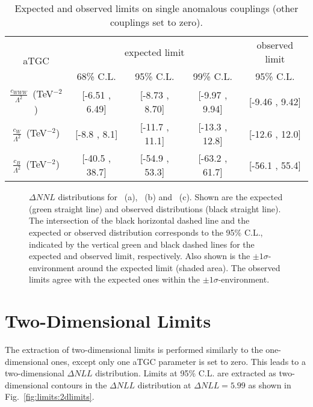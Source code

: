 \begin{table}
	\centering
	\caption[Expected and observed limits on single anomalous couplings]{Expected and observed limits on single anomalous couplings (other couplings set to zero).}
	\label{tab:limits:1dlimits}
	\begin{tabular}{ccccc}
	\hline
	\multirow{2}{*}{aTGC}              &     \multicolumn{3}{c}{expected limit} & observed limit\\
	& 68\% C.L. & 95\% C.L. & 99\% C.L. & 95\% C.L.\\
	\hline
	$\frac{c_{WWW}}{\Lambda ^2}$~(TeV$^{-2}$) & [-6.51 , 6.49] & [-8.73 , 8.70] & [-9.97 , 9.94] & [-9.46 , 9.42] \\
	$\frac{c_{W}}{\Lambda ^2}$~(TeV$^{-2}$)   & [-8.8 , 8.1]   & [-11.7 , 11.1] & [-13.3 , 12.8] & [-12.6 , 12.0] \\
	$\frac{c_{B}}{\Lambda ^2}$~(TeV$^{-2}$)   & [-40.5 , 38.7] & [-54.9 , 53.3] & [-63.2 , 61.7] & [-56.1 , 55.4] \\
	\hline
	\end{tabular}
\end{table}

\begin{figure}
	\centering
	\caption[Delta-log-likelihood distributions for the three aTGC parameters]{$\Delta NNL$ distributions for \Tcwww \ (a), \Tccw \ (b) and \Tcb \ (c). Shown are the expected (green straight line) and observed distributions (black straight line). The intersection of the black horizontal dashed line and the expected or observed distribution corresponds to the 95\% C.L., indicated by the vertical green and black dashed lines for the expected and observed limit, respectively. Also shown is the $\pm 1\sigma$-environment around the expected limit (shaded area). The observed limits agree with the expected ones within the $\pm 1\sigma$-environment.}
	\label{fig:limits:1dlimits}
\end{figure}

\section{Two-Dimensional Limits}
\label{sec:2dlims}
The extraction of two-dimensional limits is performed similarly to the one-dimensional ones, except only one aTGC parameter is set to zero. This leads to a two-dimensional $\Delta NLL$ distribution. Limits at 95\% C.L. are extracted as two-dimensional contours in the $\Delta NLL$ distribution at $\Delta NLL=5.99$ \cite{cowan} as shown in Fig.~\ref{fig:limits:2dlimits}.\\

